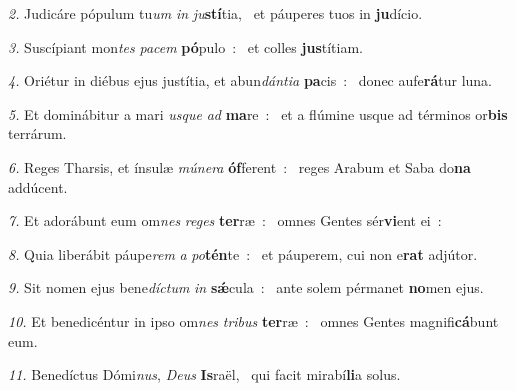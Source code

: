 \begin{psalmus}
\textit{\color{red}2.} Judicáre pópulum tu\textit{um} \textit{in} \textit{ju}\textbf{stí}tia,~\grestar{}
et páuperes tuos in \textbf{ju}dício.~\Abardot{}

\textit{\color{red}3.} Suscípiant mon\textit{tes} \textit{pa}\textit{cem} \textbf{pó}pulo~:~\grestar{}
et colles \textbf{jus}títiam.~\Abardot{}

\textit{\color{red}4.} Oriétur in diébus ejus justítia, et abun\textit{dán}\textit{ti}\textit{a} \textbf{pa}cis~:~\grestar{}
donec aufe\textbf{rá}tur luna.~\Abardot{}

\textit{\color{red}5.} Et dominábitur a mari \textit{us}\textit{que} \textit{ad} \textbf{ma}re~:~\grestar{}
et a flúmine usque ad términos or\textbf{bis} terrárum.~\Abardot{}

\textit{\color{red}6.} Reges Tharsis, et ínsulæ \textit{mú}\textit{ne}\textit{ra} \textbf{óf}ferent~:~\grestar{}
reges Arabum et Saba do\textbf{na} addúcent.~\Abardot{}

\textit{\color{red}7.} Et adorábunt eum om\textit{nes} \textit{re}\textit{ges} \textbf{ter}ræ~:~\grestar{}
omnes Gentes sér\textbf{vi}ent \hbox{ei~:~\Abardot{}}

\textit{\color{red}8.} Quia liberábit páupe\textit{rem} \textit{a} \textit{po}\textbf{tén}te~:~\grestar{}
et páuperem, cui non e\textbf{rat} adjútor.~\Abardot{}

\textit{\color{red}9.} Sit nomen ejus bene\textit{dí}\textit{ctum} \textit{in} \textbf{sǽ}cula~:~\grestar{}
ante solem pérmanet \textbf{no}men ejus.~\Abardot{}

\textit{\color{red}10.} Et benedicéntur in ipso om\textit{nes} \textit{tri}\textit{bus} \textbf{ter}ræ~:~\grestar{}
omnes Gentes magnifi\textbf{cá}bunt eum.~\Abardot{}

\textit{\color{red}11.} Benedíctus Dómi\textit{nus}, \textit{De}\textit{us} \textbf{Is}raël,~\grestar{}
qui facit mirabí\textbf{li}a solus.~\Abardot{}
\end{psalmus}
